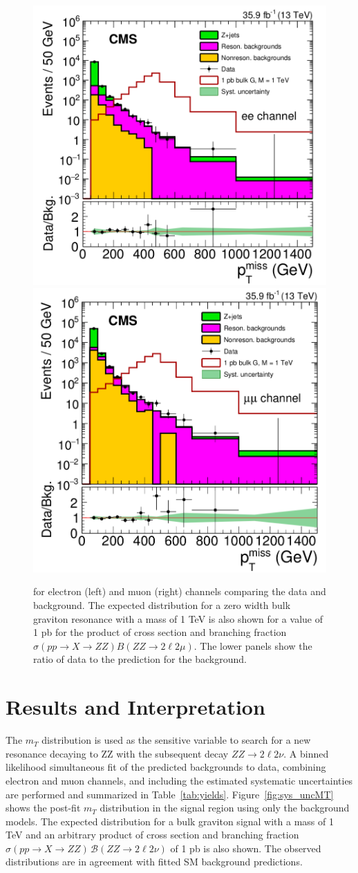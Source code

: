 \begin{figure}[htbp]
\begin{center}
\includegraphics[width=0.49\linewidth]{figures/sys_elSRuncMET.png}
\includegraphics[width=0.49\linewidth]{figures/sys_muSRuncMET.png}
\caption{\ptmiss for electron (left) and muon (right) channels comparing the data and background. The expected distribution for a zero width bulk graviton resonance with a mass of 1 TeV is also shown for a value of 1 pb for the product of cross section and branching fraction $\sigma(pp\rightarrow X\rightarrow ZZ)B(ZZ\rightarrow 2\ell 2\mu)$. The lower panels show the ratio of data to the prediction for the background. }
\label{fig:sys_uncMET}
\end{center}
\end{figure}


\section{Results and Interpretation}
The $m_T$ distribution is used as the sensitive variable to search for a new resonance decaying to ZZ with the subsequent decay $ZZ\rightarrow 2\ell 2\nu$. A binned likelihood simultaneous fit of the predicted backgrounds to data, combining electron and muon channels, and including the estimated systematic uncertainties are performed and summarized in Table~\ref{tab:yields}. Figure~\ref{fig:sys_uncMT} shows the post-fit $m_T$ distribution in the signal region using only the background models. The expected distribution for a bulk graviton signal with a mass of 1 TeV and an arbitrary product of cross section and branching fraction $\sigma(pp \to X\to ZZ)\, \mathcal{B} (ZZ\to2\ell2\nu)$ of 1 pb is also shown. The observed distributions are in agreement with fitted SM background predictions.

